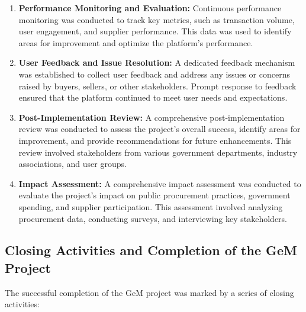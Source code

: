 \begin{enumerate}
    \item \textbf{Performance Monitoring and Evaluation:} Continuous performance monitoring was conducted to track key metrics, such as transaction volume, user engagement, and supplier performance. This data was used to identify areas for improvement and optimize the platform's performance.
    
    \item \textbf{User Feedback and Issue Resolution:} A dedicated feedback mechanism was established to collect user feedback and address any issues or concerns raised by buyers, sellers, or other stakeholders. Prompt response to feedback ensured that the platform continued to meet user needs and expectations.
    
    \item \textbf{Post-Implementation Review:} A comprehensive post-implementation review was conducted to assess the project's overall success, identify areas for improvement, and provide recommendations for future enhancements. This review involved stakeholders from various government departments, industry associations, and user groups.
    
    \item \textbf{Impact Assessment:} A comprehensive impact assessment was conducted to evaluate the project's impact on public procurement practices, government spending, and supplier participation. This assessment involved analyzing procurement data, conducting surveys, and interviewing key stakeholders.
\end{enumerate}

\subsection{Closing Activities and Completion of the GeM Project}

The successful completion of the GeM project was marked by a series of closing activities:

